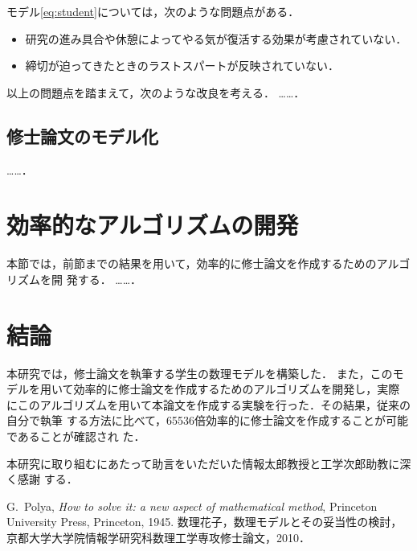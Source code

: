 \documentclass[dvipdfmx]{ampmt}
\begin{document}
モデル\eqref{eq:student}については，次のような問題点がある．
\begin{itemize}
\item 研究の進み具合や休憩によってやる気が復活する効果が考慮されていない．
\item 締切が迫ってきたときのラストスパートが反映されていない．
\end{itemize}

以上の問題点を踏まえて，次のような改良を考える．
……．

\subsection{修士論文のモデル化}
……．

\section{効率的なアルゴリズムの開発}
本節では，前節までの結果を用いて，効率的に修士論文を作成するためのアルゴリズムを開
発する．
……．

\section{結論}
本研究では，修士論文を執筆する学生の数理モデルを構築した．
また，このモデルを用いて効率的に修士論文を作成するためのアルゴリズムを開発し，実際
にこのアルゴリズムを用いて本論文を作成する実験を行った．その結果，従来の自分で執筆
する方法に比べて，65536倍効率的に修士論文を作成することが可能であることが確認され
た．

\acknowledgment
本研究に取り組むにあたって助言をいただいた情報太郎教授と工学次郎助教に深く感謝
する．

\begin{thebibliography}{10}
  G.~Polya, \textit{How to solve it: a new aspect of mathematical method},
  Princeton University Press, Princeton, 1945.
  数理花子，数理モデルとその妥当性の検討，
  京都大学大学院情報学研究科数理工学専攻修士論文，2010．
\end{thebibliography}
\end{document}
